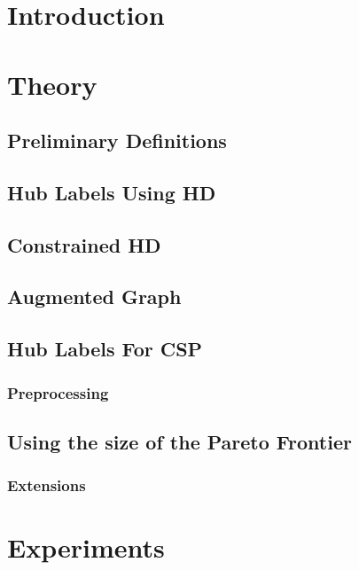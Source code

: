 \documentclass{vldb}
\begin{document}
\section{Introduction}


\section{Theory}
\subsection{Preliminary Definitions}


\subsection{Hub Labels Using HD}


\subsection{Constrained HD}


\subsection{Augmented Graph}


\subsection{Hub Labels For CSP}


\subsubsection{Preprocessing}


\subsection{Using the size of the Pareto Frontier}


\subsubsection{Extensions}


\section{Experiments}

\end{document}
